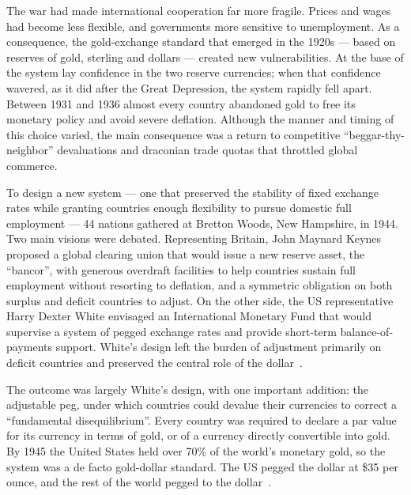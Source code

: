 The war had made international cooperation far more fragile. Prices and wages had become less flexible, and governments more sensitive to unemployment. As a consequence, the gold-exchange standard that emerged in the 1920s --- based on reserves of gold, sterling and dollars --- created new vulnerabilities. At the base of the system lay confidence in the two reserve currencies; when that confidence wavered, as it did after the Great Depression, the system rapidly fell apart. Between 1931 and 1936 almost every country abandoned gold to free its monetary policy and avoid severe deflation. Although the manner and timing of this choice varied, the main consequence was a return to competitive ``beggar-thy-neighbor'' devaluations and draconian trade quotas that throttled global commerce.

To design a new system --- one that preserved the stability of fixed exchange rates while granting countries enough flexibility to pursue domestic full employment --- 44 nations gathered at Bretton Woods, New Hampshire, in 1944. Two main visions were debated. Representing Britain, John Maynard Keynes proposed a global clearing union that would issue a new reserve asset, the ``bancor'', with generous overdraft facilities to help countries sustain full employment without resorting to deflation, and a symmetric obligation on both surplus and deficit countries to adjust. On the other side, the US representative Harry Dexter White envisaged an International Monetary Fund that would supervise a system of pegged exchange rates and provide short-term balance-of-payments support. White's design left the burden of adjustment primarily on deficit countries and preserved the central role of the dollar~\cite{Eichengreen1996,ObstfeldTaylor2004}.

The outcome was largely White's design, with one important addition: the adjustable peg, under which countries could devalue their currencies to correct a ``fundamental disequilibrium''. Every country was required to declare a par value for its currency in terms of gold, or of a currency directly convertible into gold. By 1945 the United States held over 70\% of the world's monetary gold, so the system was a de facto gold-dollar standard. The US pegged the dollar at \$35 per ounce, and the rest of the world pegged to the dollar~\cite{Mishkin2019}.
